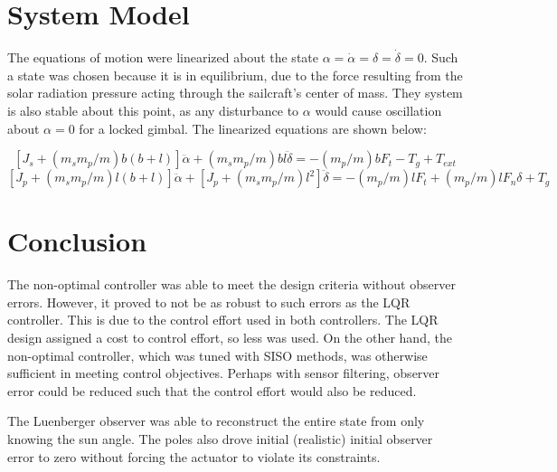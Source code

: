 \documentclass[]{aiaa-tc}%
\begin{document}
	\section{System Model}

	The equations of motion were linearized about the state $\alpha = \dot{\alpha} = \delta = \dot{\delta} =0$. Such a state was chosen because it is in equilibrium, due to the force resulting from the solar radiation pressure acting through the sailcraft's center of mass. They system is also stable about this point, as any disturbance to $\alpha$ would cause oscillation about $\alpha=0$ for a locked gimbal. The linearized equations are shown below\cite{WieSolarSail2}:

\begin{equation} \label{eq:1}
[J_s+(m_sm_p/m)b(b+l)]\ddot{\alpha}+(m_sm_p/m)bl\ddot{\delta}=-(m_p/m)bF_t-T_g+T_{ext}
\end{equation}
\begin{equation} \label{eq:2}
[J_p+(m_sm_p/m)l(b+l)]\ddot{\alpha}+[J_p+(m_sm_p/m)l^2]\ddot{\delta}=-(m_p/m)lF_t+(m_p/m)lF_n\delta+T_g
\end{equation}
	
	\vspace{5 mm}



	\section{Conclusion}

	The non-optimal controller was able to meet the design criteria without observer errors. However, it proved to not be as robust to such errors as the LQR controller. This is due to the control effort used in both controllers. The LQR design assigned a cost to control effort, so less was used. On the other hand, the non-optimal controller, which was tuned with SISO methods, was otherwise sufficient in meeting control objectives. Perhaps with sensor filtering, observer error could be reduced such that the control effort would also be reduced. 

	\vspace{5 mm}

	The Luenberger observer was able to reconstruct the entire state from only knowing the sun angle. The poles also drove initial (realistic) initial observer error to zero without forcing the actuator to violate its constraints.

	\vspace{5 mm}
\end{document}
